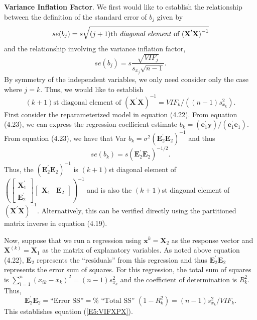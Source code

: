 \textbf{Variance Inflation Factor}. We first would like to establish
the relationship between the definition of the standard error of
$b_j$ given by
\begin{equation*}
se(b_j)=s\sqrt{(j+1)\text{th \textit{diagonal element} of }\mathbf{(X}%
^{\prime}\mathbf{X)}^{-1}}
\end{equation*}
and the relationship involving the variance inflation factor,
\begin{equation*}
se(b_j)=s\frac{\sqrt{VIF_j}}{s_{x_j}\sqrt{n-1}}.
\end{equation*}
By symmetry of the independent variables, we only need consider only
the case where $j=k$. Thus, we would like to establish
\begin{equation}\label{E5:VIFXPX}
(k+1)\text{st diagonal element of }(\mathbf{X}^{\prime}\mathbf{X}%
)^{-1}=VIF_{k}/((n-1)s_{x_{k}}^2).
\end{equation}
First consider the reparameterized model in equation (4.22). From
equation (4.23), we can express the regression coefficient estimate
$b_{k} =
(\mathbf{e}_1^{\prime}\mathbf{y})/(\mathbf{e}_1^{\prime}\mathbf{e}_1)$.
From equation (4.23), we have that Var $b_{k} = \sigma ^2(
\mathbf{E}_2^{\prime}\mathbf{E}_2)^{-1}$ and thus
\begin{equation}\label{E5:StdErrorReparam}
se(b_{k})=s(\mathbf{E}_2^{\prime}\mathbf{E}_2)^{-1/2}.
\end{equation}
Thus, the $(\mathbf{E}_2^{\prime}\mathbf{E}_2)^{-1}$ is $(k+1)$st
diagonal element of $ \left(
\begin{bmatrix} \mathbf{X}_1^{\prime} \\ \mathbf{E}_2^{\prime}
\end{bmatrix}
\begin{bmatrix}
\mathbf{X}_1 & \mathbf{E}_2
\end{bmatrix} \right)^{-1}$
and is also the $(k+1)$st diagonal element of $(\mathbf{X}^{\prime}
\mathbf{X})^{-1}$. Alternatively, this can be verified directly
using the partitioned matrix inverse in equation (4.19).

Now, suppose that we run a regression using
$\mathbf{x}^{k}=\mathbf{X}_2$ as the response vector and
$\mathbf{X}^{(k)}=\mathbf{X}_1$ as the matrix of explanatory
variables. As noted above equation (4.22), $\mathbf{E}_2$ represents
the ``residuals'' from this regression and thus
$\mathbf{E}_2^{\prime}\mathbf{E}_2$ represents the error sum of
squares. For this regression, the total sum of squares is
$\sum_{i=1}^{n}(x_{ik}-\bar{x}_{k})^2 = (n-1)s_{x_{k}}^2$ and the
coefficient of determination is $R_{k}^2$. Thus,
\begin{equation*}
\mathbf{E}_2^{\prime}\mathbf{E}_2 = \text{``Error SS''}=\text{%
``Total SS'' }(1-R_{k}^2)=(n-1)s_{x_{k}}^2/VIF_{k}.
\end{equation*}
This establishes equation (\ref{E5:VIFXPX}).


